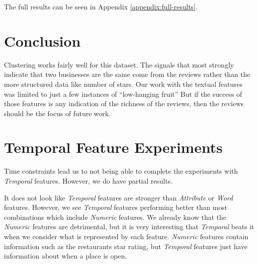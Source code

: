 \documentclass{article}
\begin{document}
The full results can be seen in Appendix \ref{appendix:full-results}.

\section{Conclusion}
Clustering works fairly well for this dataset.
The signals that most strongly indicate that two businesses are the same come from the reviews rather than the more structured data like number of stars.
Our work with the textual features was limited to just a few instances of ``low-hanging fruit''
But if the success of those features is any indication of the richness of the reviews, then the reviews should be the focus of future work.

\appendix
\appendixpage

\section{Temporal Feature Experiments}
\label{appendix:temporal-features}

Time constraints lead us to not being able to complete the experiments with \textit{Temporal} features.
However, we do have partial results.

It does not look like \textit{Temporal} features are stronger than \textit{Attribute} or \textit{Word} features.
However, we see \textit{Temporal} features performing better than most combinations which include \textit{Numeric} features.
We already know that the \textit{Numeric} features are detrimental, but it is very interesting that \textit{Temporal} beats it when we consider what is represented by each feature.
\textit{Numeric} features contain information such as the restaurants star rating, but \textit{Temporal} features just have information about when a place is open.
\end{document}
